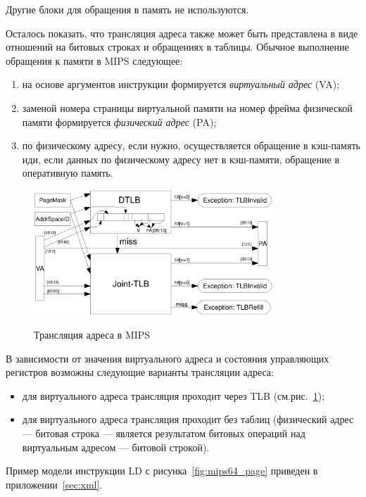 Другие блоки для обращения в память не используются.

Осталось показать, что трансляция адреса также может быть представлена в виде
отношений на битовых строках и обращениях в таблицы. Обычное выполнение
обращения к памяти в MIPS следующее:
\begin{enumerate}
    \item на основе аргументов инструкции формируется \emph{виртуальный адрес}
(VA);
    \item заменой номера страницы виртуальной памяти на номер фрейма физической
памяти формируется \emph{физический адрес} (PA);
    \item по физическому адресу, если нужно, осуществляется обращение в
кэш-память иди, если данных по физическому адресу нет в кэш-памяти, обращение в
оперативную память.
\end{enumerate}

\begin{figure}[h] \center
  \includegraphics[width=0.8\textwidth]{4.analysis/mips_addrtrans}\\
  \caption{Трансляция адреса в MIPS}\label{fig:mips_address_translation}
\end{figure}


В зависимости от значения виртуального адреса и состояния управляющих регистров
возможны следующие варианты трансляции адреса:
\begin{itemize}
  \item для виртуального адреса трансляция проходит через TLB
(см.рис.~\ref{fig:mips_address_translation});
  \item для виртуального адреса трансляция проходит без таблиц (физический адрес
--- битовая строка --- является результатом битовых операций над виртуальным
адресом --- битовой строкой).
\end{itemize}

Пример модели инструкции LD с рисунка~\ref{fig:mips64_page} приведен в приложении~\ref{sec:xml}.

